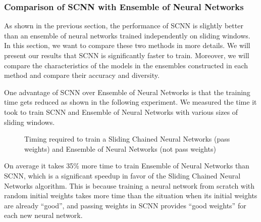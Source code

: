 \documentclass[conference]{IEEEtran}
\begin{document}
		
		
		\subsubsection{Comparison of SCNN with Ensemble of Neural Networks}
		As shown in the previous section, the performance of SCNN is slightly better than an ensemble of neural networks trained independently on sliding windows. In this section, we want to compare these two methods in more details. We will present our results that SCNN is significantly faster to train. Moreover, we will compare the characteristics of the models in the ensembles constructed in each method and compare their accuracy and diversity.
		
		One advantage of SCNN over Ensemble of Neural Networks is that the training time gets reduced as shown in the following experiment. We measured the time it took to train SCNN and Ensemble of Neural Networks  with various sizes of sliding windows.
		
		\begin{figure}[H]
			\centering
			\caption{Timing required to train a Sliding Chained Neural Networks (pass weights) and Ensemble of Neural Networks (not pass weights)}
			\label{fig:results-nnet-ens-timing}
		\end{figure}
		
		On average it takes 35\% more time to train Ensemble of Neural Networks than SCNN, which is a significant speedup in favor of the Sliding Chained Neural Networks algorithm. This is because training a neural network from scratch with random initial weights takes more time than the situation when its initial weights are already ``good'', and passing weights in SCNN provides  ``good weights'' for each new neural network.
		
\end{document}
